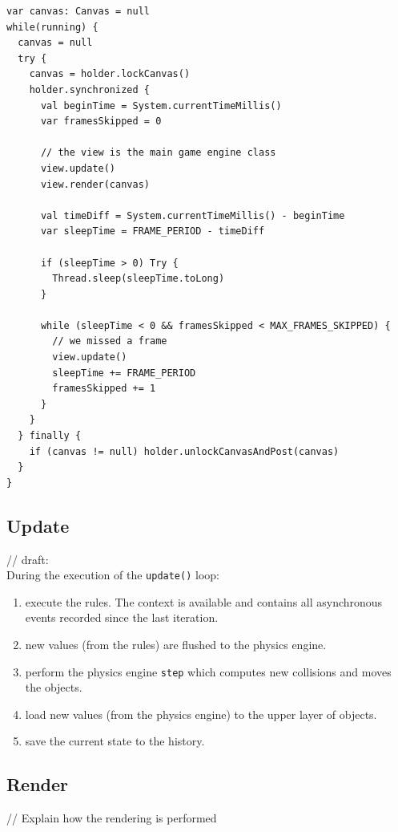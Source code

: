\documentclass[11pt,a4paper]{article}
\begin{document}
\begin{lstlisting}
var canvas: Canvas = null
while(running) {
  canvas = null
  try {
    canvas = holder.lockCanvas()
    holder.synchronized {
      val beginTime = System.currentTimeMillis()
      var framesSkipped = 0

      // the view is the main game engine class
      view.update()
      view.render(canvas)

      val timeDiff = System.currentTimeMillis() - beginTime
      var sleepTime = FRAME_PERIOD - timeDiff

      if (sleepTime > 0) Try {
        Thread.sleep(sleepTime.toLong)
      }

      while (sleepTime < 0 && framesSkipped < MAX_FRAMES_SKIPPED) {
        // we missed a frame
        view.update()
        sleepTime += FRAME_PERIOD
        framesSkipped += 1
      }
    }
  } finally {
    if (canvas != null) holder.unlockCanvasAndPost(canvas)
  }
}
\end{lstlisting}


\subsection{Update}


// draft:\\
During the execution of the \texttt{update()} loop:
\begin{enumerate}
\item execute the rules. The context is available and contains all asynchronous events recorded since the last iteration.
\item new values (from the rules) are flushed to the physics engine.
\item perform the physics engine \texttt{step} which computes new collisions and moves the objects.
\item load new values (from the physics engine) to the upper layer of objects.
\item save the current state to the history.
\end{enumerate}

\subsection{Render}

// Explain how the rendering is performed
\end{document}
